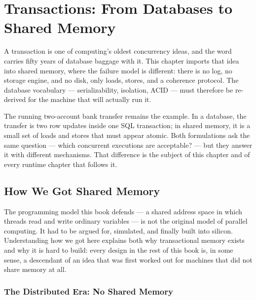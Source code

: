 \chapter{Transactions: From Databases to Shared Memory}

A transaction is one of computing's oldest concurrency ideas, and the word
carries fifty years of database baggage with it. This chapter imports that
idea into shared memory, where the failure model is different: there is no
log, no storage engine, and no disk, only loads, stores, and a coherence
protocol. The database vocabulary --- serializability, isolation, ACID ---
must therefore be re-derived for the machine that will actually run it.

The running two-account bank transfer remains the example. In a database, the
transfer is two row updates inside one SQL transaction; in shared memory, it
is a small set of loads and stores that must appear atomic. Both formulations
ask the same question --- which concurrent executions are acceptable? --- but
they answer it with different mechanisms. That difference is the subject of
this chapter and of every runtime chapter that follows it.

\section{How We Got Shared Memory}

The programming model this book defends --- a shared address space in which
threads read and write ordinary variables --- is not the original model of
parallel computing. It had to be argued for, simulated, and finally built into
silicon. Understanding how we got here explains both why transactional memory
exists and why it is hard to build: every design in the rest of this book is,
in some sense, a descendant of an idea that was first worked out for machines
that did not share memory at all.

\subsection{The Distributed Era: No Shared Memory}

